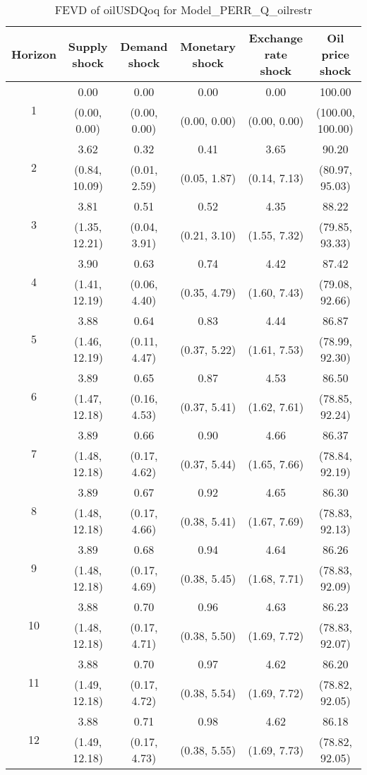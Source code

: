 \documentclass{article}
\begin{document}
\begin{table}
	\footnotesize
	\caption{FEVD of oilUSDQoq for Model_PERR_Q_oilrestr}
	\begin{tabular}{cccccc}
		Horizon & Supply shock & Demand shock & Monetary shock & Exchange rate shock & Oil price shock\\ \hline
		\multirow{2}{*}{1} & 0.00 & 0.00 & 0.00 & 0.00 & 100.00\\
		 & (0.00, 0.00) & (0.00, 0.00) & (0.00, 0.00) & (0.00, 0.00) & (100.00, 100.00)\\
		\multirow{2}{*}{2} & 3.62 & 0.32 & 0.41 & 3.65 & 90.20\\
		 & (0.84, 10.09) & (0.01, 2.59) & (0.05, 1.87) & (0.14, 7.13) & (80.97, 95.03)\\
		\multirow{2}{*}{3} & 3.81 & 0.51 & 0.52 & 4.35 & 88.22\\
		 & (1.35, 12.21) & (0.04, 3.91) & (0.21, 3.10) & (1.55, 7.32) & (79.85, 93.33)\\
		\multirow{2}{*}{4} & 3.90 & 0.63 & 0.74 & 4.42 & 87.42\\
		 & (1.41, 12.19) & (0.06, 4.40) & (0.35, 4.79) & (1.60, 7.43) & (79.08, 92.66)\\
		\multirow{2}{*}{5} & 3.88 & 0.64 & 0.83 & 4.44 & 86.87\\
		 & (1.46, 12.19) & (0.11, 4.47) & (0.37, 5.22) & (1.61, 7.53) & (78.99, 92.30)\\
		\multirow{2}{*}{6} & 3.89 & 0.65 & 0.87 & 4.53 & 86.50\\
		 & (1.47, 12.18) & (0.16, 4.53) & (0.37, 5.41) & (1.62, 7.61) & (78.85, 92.24)\\
		\multirow{2}{*}{7} & 3.89 & 0.66 & 0.90 & 4.66 & 86.37\\
		 & (1.48, 12.18) & (0.17, 4.62) & (0.37, 5.44) & (1.65, 7.66) & (78.84, 92.19)\\
		\multirow{2}{*}{8} & 3.89 & 0.67 & 0.92 & 4.65 & 86.30\\
		 & (1.48, 12.18) & (0.17, 4.66) & (0.38, 5.41) & (1.67, 7.69) & (78.83, 92.13)\\
		\multirow{2}{*}{9} & 3.89 & 0.68 & 0.94 & 4.64 & 86.26\\
		 & (1.48, 12.18) & (0.17, 4.69) & (0.38, 5.45) & (1.68, 7.71) & (78.83, 92.09)\\
		\multirow{2}{*}{10} & 3.88 & 0.70 & 0.96 & 4.63 & 86.23\\
		 & (1.48, 12.18) & (0.17, 4.71) & (0.38, 5.50) & (1.69, 7.72) & (78.83, 92.07)\\
		\multirow{2}{*}{11} & 3.88 & 0.70 & 0.97 & 4.62 & 86.20\\
		 & (1.49, 12.18) & (0.17, 4.72) & (0.38, 5.54) & (1.69, 7.72) & (78.82, 92.05)\\
		\multirow{2}{*}{12} & 3.88 & 0.71 & 0.98 & 4.62 & 86.18\\
		 & (1.49, 12.18) & (0.17, 4.73) & (0.38, 5.55) & (1.69, 7.73) & (78.82, 92.05)\\
	\end{tabular}
\label{tab:fevd-Model_PERR_Q_oilrestr-oilUSDQoq}
\end{table}
\end{document}
